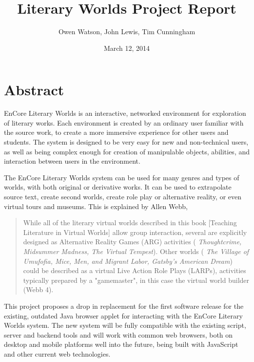 \documentclass[12pt, letterpaper]{report}
\author{Owen Watson, John Lewis, Tim Cunningham}
\title{Literary Worlds Project Report}
\date{March 12, 2014}
\begin{document}
	\begin{titlepage}
	\Huge \maketitle \par
	\end{titlepage}
	
	\chapter{Abstract}
	\par
	EnCore Literary Worlds is an interactive, networked environment for exploration of literary works. Each environment is created by an ordinary user familiar with the source work, to create a more immersive experience for other users and students. The system is designed to be very easy for new and non-technical users, as well as being complex enough for creation of manipulable objects, abilities, and interaction between users in the environment.
	
	\par
	The EnCore Literary Worlds system can be used for many genres and types of worlds, with both original or derivative works. It can be used to extrapolate source text, create second worlds, create role play or alternative reality, or even virtual tours and museums. This is explained by Allen Webb,
	
	\begin{quotation}
	While all of the literary virtual worlds described in this book [Teaching Literature in Virtual Worlds] allow group interaction, several are explicitly designed as Alternative Reality Games (ARG) activities (%
	\textit{Thoughtcrime, Midsummer Madness, The Virtual Tempest}). Other worlds (%
	\textit{The Village of Umufofia, Mice, Men, and Migrant Labor, Gatsby's American Dream})
	could be described as a virtual Live Action Role Plays (LARPs), activities typically prepared by a "gamemaster", in this case the virtual world builder (Webb 4).
	\end{quotation}
	
	\par
	This project proposes a drop in replacement for the first software release for the existing, outdated Java browser applet for interacting with the EnCore Literary Worlds system. The new system will be fully compatible with the existing script, server and backend tools and will work with common web browsers, both on desktop and mobile platforms well into the future, being built with JavaScript and other current web technologies.
	
\end{document}
